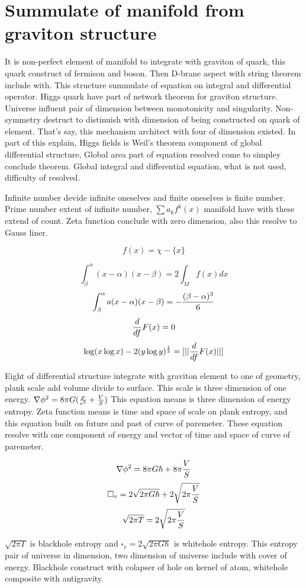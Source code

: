 \documentclass{jsarticle}
\begin{document}
\section{Summulate of manifold from graviton structure}


It is non-perfect element of manifold to integrate with graviton of quark, this quark construct of
fermison and boson. Then D-brane aspect with string theorem include with. This structure summulate
of equation on integral and differential operator. Higgs quark have part of network theorem for graviton structure.
Universe influent pair of dimension between monotonicity and singularity.
Non-symmetry destruct to distinuish with dimension of being constructed on quark of element.
That's say, this mechanism architect with four of dimension existed.
In part of this explain, Higgs fields is Weil's theorem component of global differential structure,
Global area part of equation resolved come to simpley conclude theorem.
Global integral and differential equation, what is not used, difficulty of resolved.


  Infinite number devide infinite oneselves and finite oneselves is finite number.
  Prime number extent of infinite number, $ \sum a_k f^k(x) $ manifold have with these extend of count.
Zeta function conclude with zero dimension, also this resolve to Gauss liner.

$$ f(x) = \chi - \{x\} $$

$$ \int^\alpha_\beta (x - \alpha)(x - \beta) = 2 \int_M f(x)dx $$
$$ \int^\alpha_\beta a(x - \alpha)(x - \beta) =  -{(\beta - \alpha)^3 \over 6} $$
$$ {d \over df}F(x) = 0 $$
$$ \log (x \log x) - 2(y \log y)^{1 \over 2} = [||{d \over df}F(x)||] $$

  Eight of differential structure integrate with graviton element to one of geometry,
plank scale add volume divide to surface. This scale is three dimension of one energy.
$ \nabla \phi^2 = 8 \pi G ({p \over c^3} + {V \over S}) $
This equation means is three dimension of energy entropy.
Zeta function means is time and space of scale on plank entropy,
and this equation built on future and past of curve of paremeter.
These equation resolve with one component of energy and vector of time and space of curve of paremeter.

$$ \nabla \phi^2 = 8 \pi G \hbar + 8 \pi {V \over S} $$
$$ \square_v = 2 \sqrt{2 \pi G \hbar} + 2 \sqrt{2 \pi {V \over S}} $$
$$ \sqrt{2 \pi T} = 2 \sqrt{2 \pi {V \over S}}$$

  $ \sqrt{2 \pi T} $ is blackhole entropy and $ \square_v = 2 \sqrt{2 \pi G \hbar} $ is whitehole entropy.
This entropy pair of universe in dimension, two dimension of universe include with cover of energy.
Blackhole construct with colapser of hole on kernel of atom, whitehole composite with antigravity.
\end{document}
